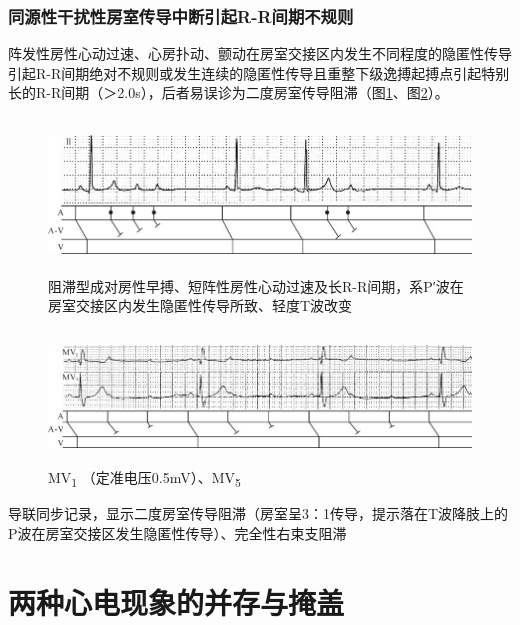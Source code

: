\protect\hypertarget{text00042.htmlux5cux23subid464}{}{}

\subsection{同源性干扰性房室传导中断引起R-R间期不规则}

阵发性房性心动过速、心房扑动、颤动在房室交接区内发生不同程度的隐匿性传导引起R-R间期绝对不规则或发生连续的隐匿性传导且重整下级逸搏起搏点引起特别长的R-R间期（＞2.0s），后者易误诊为二度房室传导阻滞（图\ref{fig35-18}、图\ref{fig35-19}）。

\begin{figure}[!htbp]
 \centering
 \includegraphics[width=5.76042in,height=1.61458in]{./images/Image00571.jpg}
 \captionsetup{justification=centering}
 \caption{阻滞型成对房性早搏、短阵性房性心动过速及长R-R间期，系P′波在房室交接区内发生隐匿性传导所致、轻度T波改变}
 \label{fig35-18}
  \end{figure} 

\begin{figure}[!htbp]
 \centering
 \includegraphics[width=5.78125in,height=1.39583in]{./images/Image00572.jpg}
 \captionsetup{justification=centering}
 \caption{MV\textsubscript{1} （定准电压0.5mV）、MV\textsubscript{5}}
 \label{fig35-19}
  \end{figure} 
导联同步记录，显示二度房室传导阻滞（房室呈3：1传导，提示落在T波降肢上的P波在房室交接区发生隐匿性传导）、完全性右束支阻滞

\protect\hypertarget{text00043.html}{}{}

\protect\hypertarget{text00043.htmlux5cux23chapter43}{}{}

\chapter{两种心电现象的并存与掩盖}

